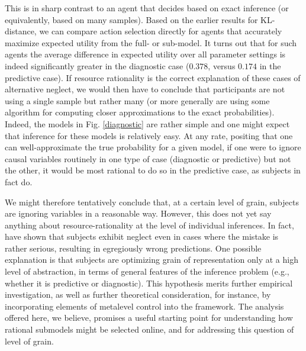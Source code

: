 \documentclass[10pt,letterpaper]{article}
\begin{document}
This is in sharp contrast to an agent that decides based on exact inference (or equivalently, based on many samples).
Based on the earlier results for KL-distance, we can compare action selection directly for agents that accurately maximize expected utility from the full- or sub-model.
It turns out that for such agents the average difference in expected utility over all parameter settings is indeed significantly greater in the diagnostic case ($0.378$, versus $0.174$ in the predictive case).
If resource rationality is the correct explanation of these cases of alternative neglect, we would then have to conclude that participants are not using a single sample but rather many (or more generally are using some algorithm for computing closer approximations to the exact probabilities).
Indeed, the models in Fig. \ref{diagnostic} are rather simple and one might expect that inference for these models is relatively easy.
At any rate, positing that one can well-approximate the true probability for a given model, if one were to ignore causal variables routinely in one type of case (diagnostic or predictive) but not the other, it would be most rational to do so in the predictive case, as subjects in fact do. 


We might therefore tentatively conclude that, at a certain level of grain, subjects are ignoring variables in a reasonable way. 
However, this does not yet say anything about resource-rationality at the level of individual inferences. In fact, \cite{Fernbach2013} have shown that subjects exhibit neglect even in cases where the mistake is rather serious, resulting in egregiously wrong predictions. One possible explanation is that subjects are optimizing grain of representation only at a high level of abstraction, in terms of general features of the inference problem (e.g., whether it is predictive or diagnostic). This hypothesis merits further empirical investigation, as well as further theoretical consideration, for instance, by incorporating elements of metalevel control \citep{Icard2014,Lieder2014} into the framework. The analysis offered here, we believe, promises a useful starting point for understanding how rational submodels might be selected online, and for addressing this question of level of grain.
\end{document}
